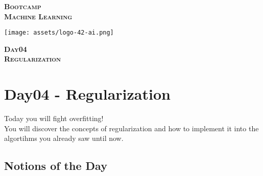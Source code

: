 \documentclass[]{article}
\date{}
\begin{document}

\vspace*{2cm}
\begin{center}
    \textsc{\fontsize{40}{48} \bfseries Bootcamp}\\[0.6cm]
    \textsc{\fontsize{39}{48} \bfseries { %
Machine Learning
    }}\\[0.3cm]
\end{center}
\vspace{3cm}

\begin{center}
\texttt{[image: assets/logo-42-ai.png]}{\centering}
\end{center}

\vspace*{2cm}
\begin{center}
    \textsc{\fontsize{32}{48} \bfseries %
Day04    
    }\\[0.6cm]
    \textsc{\fontsize{32}{48} \bfseries %
Regularization    
    }\\[0.3cm]
\end{center}
\vspace{3cm}

\newpage

\setcounter{page}{1}



\hypertarget{day04---regularization}{%
\section{Day04 - Regularization}\label{day04---regularization}}

Today you will fight overfitting!\\
You will discover the concepts of regularization and how to implement it
into the algortihms you already saw until now.

\hypertarget{notions-of-the-day}{%
\subsection{Notions of the Day}\label{notions-of-the-day}}
\end{document}
